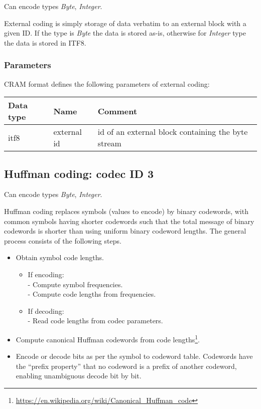 \documentclass[a4paper]{article}
\begin{document}
Can encode types \textit{Byte}, \textit{Integer}.

External coding is simply storage of data verbatim to an external block with a given ID.
If the type is \textit{Byte} the data is stored as-is, otherwise for \textit{Integer} type the data is stored in ITF8.

\subsubsection*{Parameters}

CRAM format defines the following parameters of external coding: 

\begin{tabular}{|>{\raggedright}p{100pt}|>{\raggedright}p{100pt}|>{\raggedright}p{230pt}|}
\hline
\textbf{Data type} & \textbf{Name} & \textbf{Comment}
\tabularnewline
\hline
itf8 & external id & id of an external block containing the byte stream\tabularnewline
\hline
\end{tabular}

\subsection{Huffman coding: codec ID 3}

Can encode types \textit{Byte}, \textit{Integer}.

Huffman coding replaces symbols (values to encode) by binary codewords, with common symbols having shorter codewords such that the total message of binary codewords is shorter than using uniform binary codeword lengths.
The general process consists of the following steps.

\begin{itemize}
\item Obtain symbol code lengths.
\begin{itemize}
\item If encoding:\\
- Compute symbol frequencies.\\
- Compute code lengths from frequencies.
\item If decoding:\\
- Read code lengths from codec parameters.
\end{itemize}

\item Compute canonical Huffman codewords from code lengths\footnote{\url{https://en.wikipedia.org/wiki/Canonical_Huffman_code}}.

\item Encode or decode bits as per the symbol to codeword table.
Codewords have the ``prefix property'' that no codeword is a prefix of another codeword, enabling unambiguous decode bit by bit.
\end{itemize}
\end{document}
